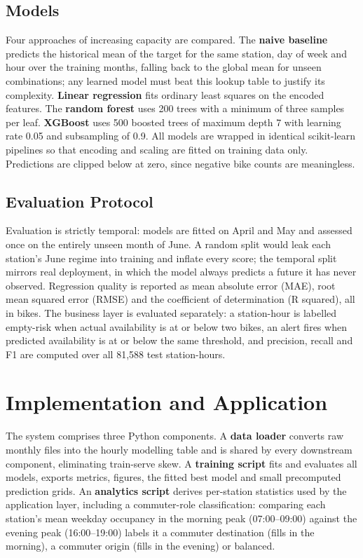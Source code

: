 \documentclass[conference]{IEEEtran}
\begin{document}
\subsection{Models}
Four approaches of increasing capacity are compared. The \textbf{naive baseline} predicts the historical mean of the target for the same station, day of week and hour over the training months, falling back to the global mean for unseen combinations; any learned model must beat this lookup table to justify its complexity. \textbf{Linear regression} fits ordinary least squares on the encoded features. The \textbf{random forest} \cite{probst2019hyperparameters} uses 200 trees with a minimum of three samples per leaf. \textbf{XGBoost} \cite{chen2016xgboost} uses 500 boosted trees of maximum depth 7 with learning rate 0.05 and subsampling of 0.9. All models are wrapped in identical scikit-learn pipelines so that encoding and scaling are fitted on training data only. Predictions are clipped below at zero, since negative bike counts are meaningless.

\subsection{Evaluation Protocol}
Evaluation is strictly temporal: models are fitted on April and May and assessed once on the entirely unseen month of June. A random split would leak each station's June regime into training and inflate every score; the temporal split mirrors real deployment, in which the model always predicts a future it has never observed. Regression quality is reported as mean absolute error (MAE), root mean squared error (RMSE) and the coefficient of determination (R squared), all in bikes. The business layer is evaluated separately: a station-hour is labelled empty-risk when actual availability is at or below two bikes, an alert fires when predicted availability is at or below the same threshold, and precision, recall and F1 are computed over all 81,588 test station-hours.

\section{Implementation and Application}
The system comprises three Python components. A \textbf{data loader} converts raw monthly files into the hourly modelling table and is shared by every downstream component, eliminating train-serve skew. A \textbf{training script} fits and evaluates all models, exports metrics, figures, the fitted best model and small precomputed prediction grids. An \textbf{analytics script} derives per-station statistics used by the application layer, including a commuter-role classification: comparing each station's mean weekday occupancy in the morning peak (07:00--09:00) against the evening peak (16:00--19:00) labels it a commuter destination (fills in the morning), a commuter origin (fills in the evening) or balanced.
\end{document}
